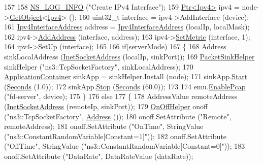 \begin{DoxyCode}
157 
158   \hyperlink{group__logging_gafbd73ee2cf9f26b319f49086d8e860fb}{NS\_LOG\_INFO} (\textcolor{stringliteral}{"Create IPv4 Interface"});
159   \hyperlink{classns3_1_1Ptr}{Ptr<Ipv4>} ipv4 = node->\hyperlink{classns3_1_1Object_a13e18c00017096c8381eb651d5bd0783}{GetObject}<\hyperlink{classns3_1_1Ipv4}{Ipv4}> ();
160   uint32\_t \textcolor{keyword}{interface }= ipv4->AddInterface (device);
161   \hyperlink{classns3_1_1Ipv4InterfaceAddress}{Ipv4InterfaceAddress} address = \hyperlink{classns3_1_1Ipv4InterfaceAddress}{Ipv4InterfaceAddress} (localIp, 
      localMask);
162   ipv4->\hyperlink{classns3_1_1Ipv4_ad203526cae6a4b86f1bb89e44d2b62f7}{AddAddress} (interface, address);
163   ipv4->\hyperlink{classns3_1_1Ipv4_a2b5632573b67957fabe2dfea248a57a3}{SetMetric} (interface, 1);
164   ipv4->\hyperlink{classns3_1_1Ipv4_a71b2f8acca4923aef907b50b3196bf23}{SetUp} (interface);
165 
166   \textcolor{keywordflow}{if}(serverMode)
167   \{
168     \hyperlink{classns3_1_1Address}{Address} sinkLocalAddress (\hyperlink{classns3_1_1InetSocketAddress}{InetSocketAddress} (localIp, sinkPort));
169     \hyperlink{classns3_1_1PacketSinkHelper}{PacketSinkHelper} sinkHelper (\textcolor{stringliteral}{"ns3::TcpSocketFactory"}, sinkLocalAddress);
170     \hyperlink{classns3_1_1ApplicationContainer}{ApplicationContainer} sinkApp = sinkHelper.Install (node);
171     sinkApp.\hyperlink{classns3_1_1ApplicationContainer_a8eff87926507020bbe3e1390358a54a7}{Start} (\hyperlink{group__timecivil_ga33c34b816f8ff6628e33d5c8e9713b9e}{Seconds} (1.0));
172     sinkApp.\hyperlink{classns3_1_1ApplicationContainer_adfc52f9aa4020c8714679b00bbb9ddb3}{Stop} (\hyperlink{group__timecivil_ga33c34b816f8ff6628e33d5c8e9713b9e}{Seconds} (60.0));
173     
174     emu.\hyperlink{classns3_1_1PcapHelperForDevice_a74866def9a881aa9d5c5be1225a26722}{EnablePcap} (\textcolor{stringliteral}{"fd-server"}, device);
175   \}
176   \textcolor{keywordflow}{else}
177   \{
178     AddressValue remoteAddress (\hyperlink{classns3_1_1InetSocketAddress}{InetSocketAddress} (remoteIp, sinkPort));
179     \hyperlink{classns3_1_1OnOffHelper}{OnOffHelper} onoff (\textcolor{stringliteral}{"ns3::TcpSocketFactory"}, \hyperlink{classns3_1_1Address}{Address} ());
180     onoff.SetAttribute (\textcolor{stringliteral}{"Remote"}, remoteAddress);
181     onoff.SetAttribute (\textcolor{stringliteral}{"OnTime"}, StringValue (\textcolor{stringliteral}{"ns3::ConstantRandomVariable[Constant=1]"}));
182     onoff.SetAttribute (\textcolor{stringliteral}{"OffTime"}, StringValue (\textcolor{stringliteral}{"ns3::ConstantRandomVariable[Constant=0]"}));
183     onoff.SetAttribute (\textcolor{stringliteral}{"DataRate"}, DataRateValue (dataRate));

\end{DoxyCode}
